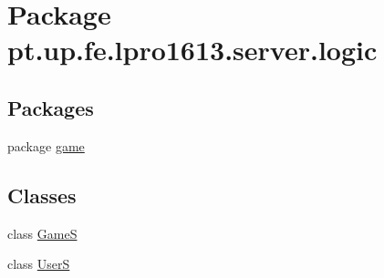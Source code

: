 \hypertarget{namespacept_1_1up_1_1fe_1_1lpro1613_1_1server_1_1logic}{}\section{Package pt.\+up.\+fe.\+lpro1613.\+server.\+logic}
\label{namespacept_1_1up_1_1fe_1_1lpro1613_1_1server_1_1logic}
\subsection*{Packages}
\begin{DoxyCompactItemize}
\item 
package \hyperlink{namespacept_1_1up_1_1fe_1_1lpro1613_1_1server_1_1logic_1_1game}{game}
\end{DoxyCompactItemize}
\subsection*{Classes}
\begin{DoxyCompactItemize}
\item 
class \hyperlink{classpt_1_1up_1_1fe_1_1lpro1613_1_1server_1_1logic_1_1_game_s}{GameS}
\item 
class \hyperlink{classpt_1_1up_1_1fe_1_1lpro1613_1_1server_1_1logic_1_1_user_s}{UserS}
\end{DoxyCompactItemize}
